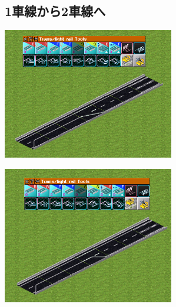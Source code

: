 \documentclass{jbook}
\begin{document}
\newpage


\subsection{1車線から2車線へ}
\label{sub:1lane_to_2lane}

\begin{multicols}{2}
  \includegraphics[width = 75mm]{picture/20210214-road-4-6.png}

  \includegraphics[width = 75mm]{picture/20210214-road-4-7.png}
\end{multicols}

\vspace{10pt}
\end{document}
